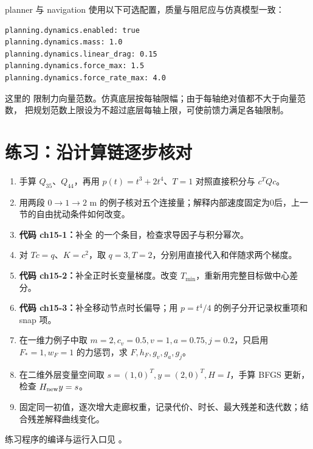 \par\noindent
\begin{minipage}{\linewidth}
planner 与 navigation 使用以下可选配置，质量与阻尼应与仿真模型一致：
\begin{lstlisting}[language={},numbers=none]
planning.dynamics.enabled: true
planning.dynamics.mass: 1.0
planning.dynamics.linear_drag: 0.15
planning.dynamics.force_max: 1.5
planning.dynamics.force_rate_max: 4.0
\end{lstlisting}
\end{minipage}
\par
这里的  限制力向量范数。仿真底层按每轴限幅；由于每轴绝对值都不大于向量范数，
把规划范数上限设为不超过底层每轴上限，可使前馈力满足各轴限制。

\section{练习：沿计算链逐步核对}
\begin{enumerate}
\item 手算 $Q_{35}$、$Q_{44}$，再用 $p(t)=t^3+2t^4$、$T=1$ 对照直接积分与 $c^TQc$。
\item 用两段 $0\to1\to2$ m 的例子核对五个连接量；解释内部速度固定为0后，上一节的自由扰动条件如何改变。
\item \textbf{代码 ch15-1：}补全  的一个条目，检查求导因子与积分幂次。
\item 对 $Tc=q$、$K=c^2$，取 $q=3,T=2$，分别用直接代入和伴随求两个梯度。
\item \textbf{代码 ch15-2：}补全正时长变量梯度。改变 $T_{\min}$，重新用完整目标做中心差分。
\item \textbf{代码 ch15-3：}补全移动节点时长偏导；用 $p=t^4/4$ 的例子分开记录权重项和 snap 项。
\item 在一维力例子中取 $m=2,c_v=0.5,v=1,a=0.75,j=0.2$，只启用 $F_*=1,w_F=1$ 的力惩罚，求 $F,h_F,g_v,g_a,g_j$。
\item 在二维外层变量空间取 $s=(1,0)^T,y=(2,0)^T,H=I$，手算 BFGS 更新，检查 $H_{\rm new}y=s$。
\item 固定同一初值，逐次增大走廊权重，记录代价、时长、最大残差和迭代数；结合残差解释曲线变化。
\end{enumerate}
练习程序的编译与运行入口见 。

